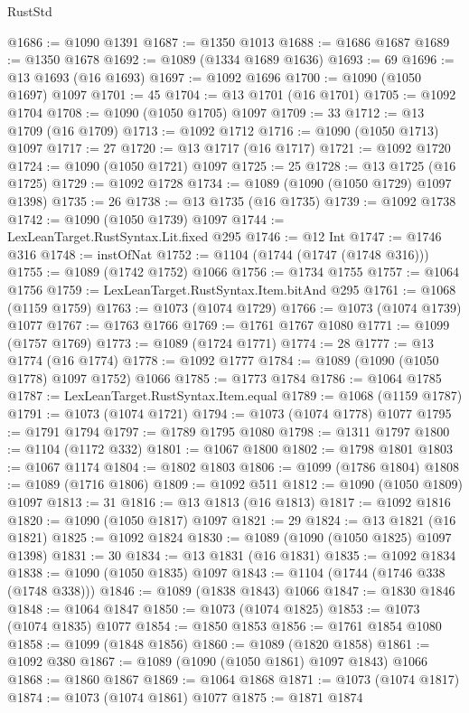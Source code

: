 \begin{lexlean}{RustStd}
\begin{coremodule}
@1686 := @1090 @1391
@1687 := @1350 @1013
@1688 := @1686 @1687
@1689 := @1350 @1678
@1692 := @1089 (@1334 @1689 @1636)
@1693 := 69
@1696 := @13 @1693 (@16 @1693)
@1697 := @1092 @1696
@1700 := @1090 (@1050 @1697) @1097
@1701 := 45
@1704 := @13 @1701 (@16 @1701)
@1705 := @1092 @1704
@1708 := @1090 (@1050 @1705) @1097
@1709 := 33
@1712 := @13 @1709 (@16 @1709)
@1713 := @1092 @1712
@1716 := @1090 (@1050 @1713) @1097
@1717 := 27
@1720 := @13 @1717 (@16 @1717)
@1721 := @1092 @1720
@1724 := @1090 (@1050 @1721) @1097
@1725 := 25
@1728 := @13 @1725 (@16 @1725)
@1729 := @1092 @1728
@1734 := @1089 (@1090 (@1050 @1729) @1097 @1398)
@1735 := 26
@1738 := @13 @1735 (@16 @1735)
@1739 := @1092 @1738
@1742 := @1090 (@1050 @1739) @1097
@1744 := LexLeanTarget.RustSyntax.Lit.fixed @295
@1746 := @12 Int
@1747 := @1746 @316
@1748 := instOfNat
@1752 := @1104 (@1744 (@1747 (@1748 @316)))
@1755 := @1089 (@1742 @1752) @1066
@1756 := @1734 @1755
@1757 := @1064 @1756
@1759 := LexLeanTarget.RustSyntax.Item.bitAnd @295
@1761 := @1068 (@1159 @1759)
@1763 := @1073 (@1074 @1729)
@1766 := @1073 (@1074 @1739) @1077
@1767 := @1763 @1766
@1769 := @1761 @1767 @1080
@1771 := @1099 (@1757 @1769)
@1773 := @1089 (@1724 @1771)
@1774 := 28
@1777 := @13 @1774 (@16 @1774)
@1778 := @1092 @1777
@1784 := @1089 (@1090 (@1050 @1778) @1097 @1752) @1066
@1785 := @1773 @1784
@1786 := @1064 @1785
@1787 := LexLeanTarget.RustSyntax.Item.equal
@1789 := @1068 (@1159 @1787)
@1791 := @1073 (@1074 @1721)
@1794 := @1073 (@1074 @1778) @1077
@1795 := @1791 @1794
@1797 := @1789 @1795 @1080
@1798 := @1311 @1797
@1800 := @1104 (@1172 @332)
@1801 := @1067 @1800
@1802 := @1798 @1801
@1803 := @1067 @1174
@1804 := @1802 @1803
@1806 := @1099 (@1786 @1804)
@1808 := @1089 (@1716 @1806)
@1809 := @1092 @511
@1812 := @1090 (@1050 @1809) @1097
@1813 := 31
@1816 := @13 @1813 (@16 @1813)
@1817 := @1092 @1816
@1820 := @1090 (@1050 @1817) @1097
@1821 := 29
@1824 := @13 @1821 (@16 @1821)
@1825 := @1092 @1824
@1830 := @1089 (@1090 (@1050 @1825) @1097 @1398)
@1831 := 30
@1834 := @13 @1831 (@16 @1831)
@1835 := @1092 @1834
@1838 := @1090 (@1050 @1835) @1097
@1843 := @1104 (@1744 (@1746 @338 (@1748 @338)))
@1846 := @1089 (@1838 @1843) @1066
@1847 := @1830 @1846
@1848 := @1064 @1847
@1850 := @1073 (@1074 @1825)
@1853 := @1073 (@1074 @1835) @1077
@1854 := @1850 @1853
@1856 := @1761 @1854 @1080
@1858 := @1099 (@1848 @1856)
@1860 := @1089 (@1820 @1858)
@1861 := @1092 @380
@1867 := @1089 (@1090 (@1050 @1861) @1097 @1843) @1066
@1868 := @1860 @1867
@1869 := @1064 @1868
@1871 := @1073 (@1074 @1817)
@1874 := @1073 (@1074 @1861) @1077
@1875 := @1871 @1874

\end{coremodule}
\end{lexlean}
